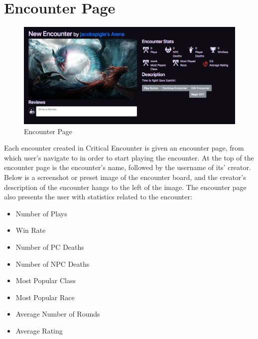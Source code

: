 \documentclass[12pt,a4paper]{report}
\begin{document}
	\section{Encounter Page}
	\begin{figure}[H]
		\centering
		\includegraphics[scale=.4]{encounter}
		\caption{Encounter Page}
		\label{fig: Encounter Page}
	\end{figure}
	Each encounter created in Critical Encounter is given an encounter page, from which user's navigate to in order to start playing the encounter. At the top of the encounter page is the encounter's name, followed by the username of its' creator. Below is a screenshot or preset image of the encounter board, and the creator's description of the encounter hangs to the left of the image. The encounter page also presents the user with statistics related to the encounter:
	\begin{multicols}{2}
		\begin{itemize}
			\item Number of Plays
			\item Win Rate
			\item Number of PC Deaths
			\item Number of NPC Deaths
			\item Most Popular Class
			\item Most Popular Race
			\item Average Number of Rounds
			\item Average Rating
		\end{itemize}
	\end{multicols}
	\newpage
\end{document}
